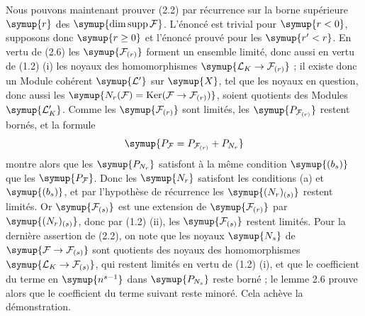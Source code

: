 Nous pouvons maintenant prouver (2.2) par récurrence sur la borne supérieure
$\symup{r}$ des $\symup{\dim\operatorname{supp}\mathcal F}$. L'énoncé est trivial pour $\symup{r<0}$,
supposons donc $\symup{r\geq0}$ et l'énoncé prouvé pour les $\symup{r'<r}$. En vertu de (2.6)
les $\symup{\mathcal F_{(r)}}$ forment un ensemble limité, donc aussi en vertu de (1.2)
(i) les noyaux des homomorphismes
$\symup{\mathcal L_K\to\mathcal F_{(r)}}$ ; il existe donc un Module
cohérent $\symup{\mathcal L'}$ sur $\symup{X}$, tel que les noyaux en question, donc aussi les
$\symup{N_r(\mathcal F)=\operatorname{Ker}(\mathcal F\to\mathcal F_{(r)})}$, soient quotients des Modules $\symup{\mathcal L'_K}$. Comme les $\symup{\mathcal F_{(r)}}$ sont
limités, les $\symup{P_{\mathcal F_{(r)}}}$ restent bornés, et la formule
\[
\symup{P_{\mathcal F}=P_{\mathcal F_{(r)}}+P_{N_r}}
\]
montre alors que les $\symup{P_{N_r}}$ satisfont à la même condition $\symup{(b_s)}$ que les
$\symup{P_{\mathcal F}}$. Donc les $\symup{N_r}$ satisfont les conditions (a) et $\symup{(b_s)}$, et
par l'hypothèse de récurrence les $\symup{(N_r)_{(s)}}$ restent limités. Or
$\symup{\mathcal F_{(s)}}$ est une extension de $\symup{\mathcal F_{(r)}}$ par
$\symup{(N_r)_{(s)}}$, donc par (1.2) (ii), les $\symup{\mathcal F_{(s)}}$ restent limités.
Pour la dernière assertion de (2.2), on note que les noyaux $\symup{N_s}$ de
$\symup{\mathcal F\to\mathcal F_{(s)}}$ sont quotients des noyaux des
homomorphismes $\symup{\mathcal L_K\to\mathcal F_{(s)}}$, qui restent limités en vertu de (1.2)
(i), et que le coefficient du terme en $\symup{n^{s-1}}$ dans $\symup{P_{N_s}}$ reste borné ;
le lemme 2.6 prouve alors que le coefficient du terme suivant reste minoré.
Cela achève la démonstration.


